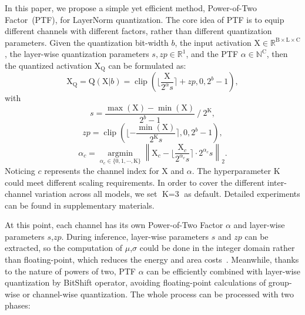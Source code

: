 \documentclass{article}
\begin{document}
In this paper, we propose a simple yet efficient method, Power-of-Two Factor~(PTF), for LayerNorm quantization. The core idea of PTF is to equip different channels with different factors, rather than different quantization parameters. Given the quantization bit-width $b$, the input activation $\textrm{X}\in \mathds{R}^{\textrm{B}\times \textrm{L}\times \textrm{C}}$, the layer-wise quantization parameters $s,zp\in \mathds{R}^\textrm{1}$, and the PTF $\alpha \in \mathds{N}^\textrm{C}$, then the quantized activation $\textrm{X}_\textrm{Q}$ can be formulated as:
\begin{equation}
    \textrm{X}_\textrm{Q}=\textrm{Q}(\textrm{X}|b)=\operatorname{clip}(\lfloor\frac{\textrm{X}}{\textrm{2}^{\alpha}s}\rceil+zp, \textrm{0},\textrm{2}^{b}-1),
\end{equation}
with
\begin{equation}
    s=\frac{\max(\textrm{X})-\min(\textrm{X})}{\textrm{2}^b-\textrm{1}}~/~\textrm{2}^\textrm{K},
\end{equation}
\begin{equation}
    zp=\operatorname{clip}(\lfloor-\frac{\min(\textrm{X})}{\textrm{2}^\textrm{K}s}\rceil, \textrm{0}, \textrm{2}^{b}-\textrm{1}),
\end{equation}
\begin{equation}
    \alpha_c=\underset{{\alpha_c\in\{\textrm{0},\textrm{1},\cdots,\textrm{K}\}}}{\operatorname{\arg \min}}\left\|\textrm{X}_c-\lfloor\frac{\textrm{X}_c}{\textrm{2}^{\alpha_c}s}\rceil\cdot \textrm{2}^{\alpha_c}s\right\|_\textrm{2}.
\end{equation}
Noticing $c$ represents the channel index for $\textrm{X}$ and $\alpha$. The hyperparameter $\textrm{K}$ could meet different scaling requirements. In order to cover the different inter-channel variation across all models, we set $\textrm{K}=\textrm{3}$ as default. Detailed experiments can be found in supplementary materials.

At this point, each channel has its own Power-of-Two Factor $\alpha$ and layer-wise parameters $s$,$zp$. 
During inference, layer-wise parameters $s$ and $zp$ can be extracted, so the computation of $\mu$,$\sigma$ could be done in the integer domain rather than floating-point, which reduces the energy and area costs~\cite{8716697}. Meanwhile, thanks to the nature of powers of two, PTF $\alpha$ can be efficiently combined with layer-wise quantization by BitShift operator, avoiding floating-point calculations of 
group-wise or channel-wise quantization. The whole process can be processed with two phases:
\end{document}
